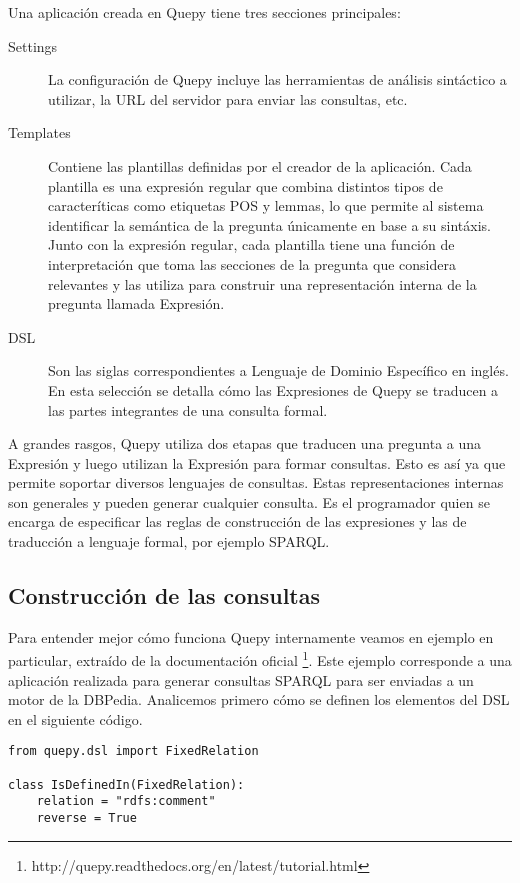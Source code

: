 Una aplicación creada en Quepy tiene tres secciones principales:
\begin{description}
    \item[Settings] La configuración de Quepy incluye las herramientas de análisis sintáctico a utilizar, la URL del servidor para enviar las consultas, etc.
    \item[Templates] Contiene las plantillas definidas por el creador de la aplicación. Cada plantilla es una expresión regular que combina distintos tipos de caracteríticas como etiquetas POS y lemmas, lo que permite al sistema identificar la semántica de la pregunta únicamente en base a su sintáxis. Junto con la expresión regular, cada plantilla tiene una función de interpretación que toma las secciones de la pregunta que considera relevantes y las utiliza para construir una representación interna de la pregunta llamada Expresión.
    \item[DSL] Son las siglas correspondientes a Lenguaje de Dominio Específico en inglés. En esta selección se detalla cómo las Expresiones de Quepy se traducen a las partes integrantes de una consulta formal.
\end{description}

A grandes rasgos, Quepy utiliza dos etapas que traducen una pregunta a una Expresión y luego utilizan la Expresión para formar consultas. Esto es así ya que permite soportar diversos lenguajes de consultas. Estas representaciones internas son generales y pueden generar cualquier consulta. Es el programador quien se encarga de especificar las reglas de construcción de las expresiones y las de traducción a lenguaje formal, por ejemplo SPARQL.

\subsection{Construcción de las consultas}

Para entender mejor cómo funciona Quepy internamente veamos en ejemplo en particular, extraído de la documentación oficial \footnote{http://quepy.readthedocs.org/en/latest/tutorial.html}. Este ejemplo corresponde a una aplicación realizada para generar consultas SPARQL para ser enviadas a un motor de la DBPedia. Analicemos primero cómo se definen los elementos del DSL en el siguiente código.

\vspace{5mm}

\begin{lstlisting}
from quepy.dsl import FixedRelation

class IsDefinedIn(FixedRelation):
    relation = "rdfs:comment"
    reverse = True
\end{lstlisting}

